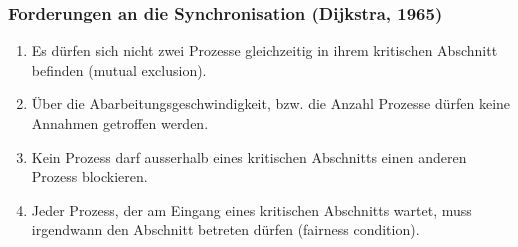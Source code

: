 \subsubsection{Forderungen an die Synchronisation (Dijkstra, 1965)}
\begin{enumerate}
  \item Es dürfen sich nicht zwei Prozesse gleichzeitig in ihrem kritischen Abschnitt befinden (mutual exclusion).
  \item Über die Abarbeitungsgeschwindigkeit, bzw. die Anzahl Prozesse dürfen
keine Annahmen getroffen werden. 
  \item Kein Prozess darf ausserhalb eines kritischen Abschnitts einen anderen
Prozess blockieren. 
  \item Jeder Prozess, der am Eingang eines kritischen Abschnitts wartet, muss
irgendwann den Abschnitt betreten dürfen (fairness condition).
\end{enumerate}

